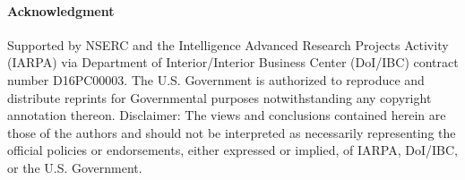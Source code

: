 \paragraph{Acknowledgment} Supported by NSERC and the Intelligence Advanced Research Projects
Activity (IARPA) via Department of Interior/Interior Business Center (DoI/IBC) contract number
D16PC00003. The U.S. Government is authorized to reproduce and distribute reprints for Governmental
purposes notwithstanding any copyright annotation thereon. Disclaimer: The views and conclusions
contained herein are those of the authors and should not be interpreted as necessarily representing
the official policies or endorsements, either expressed or implied, of IARPA, DoI/IBC, or the U.S.
Government.